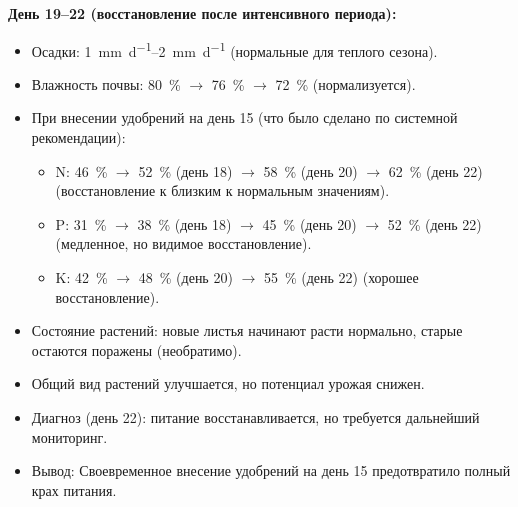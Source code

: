 \textbf{День 19--22 (восстановление после интенсивного периода):}
\begin{itemize}
    \item Осадки: \SIrange{1}{2}{\milli\meter\per\day} (нормальные для теплого сезона).
    \item Влажность почвы: \SI{80}{\percent} $\to$ \SI{76}{\percent} $\to$ \SI{72}{\percent} (нормализуется).
    \item При внесении удобрений на день \num{15} (что было сделано по системной рекомендации):
    \begin{itemize}
        \item N: \SI{46}{\percent} $\to$ \SI{52}{\percent} (день \num{18}) $\to$ \SI{58}{\percent} (день \num{20}) $\to$ \SI{62}{\percent} (день \num{22}) (восстановление к близким к нормальным значениям).
        \item P: \SI{31}{\percent} $\to$ \SI{38}{\percent} (день \num{18}) $\to$ \SI{45}{\percent} (день \num{20}) $\to$ \SI{52}{\percent} (день \num{22}) (медленное, но видимое восстановление).
        \item K: \SI{42}{\percent} $\to$ \SI{48}{\percent} (день \num{20}) $\to$ \SI{55}{\percent} (день \num{22}) (хорошее восстановление).
    \end{itemize}
    \item Состояние растений: новые листья начинают расти нормально, старые остаются поражены (необратимо).
    \item Общий вид растений улучшается, но потенциал урожая снижен.
    \item Диагноз (день \num{22}): питание восстанавливается, но требуется дальнейший мониторинг.
    \item Вывод: Своевременное внесение удобрений на день \num{15} предотвратило полный крах питания.
\end{itemize}

